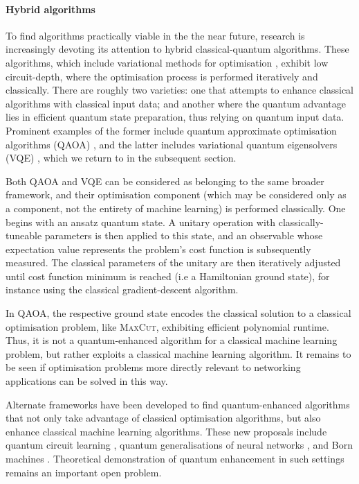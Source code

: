 \paragraph{Hybrid algorithms}

To find algorithms practically viable in the the near future, research is increasingly devoting its attention to hybrid classical-quantum algorithms. These algorithms, which include variational methods for optimisation \cite{bib:moll2018quantum}, exhibit low circuit-depth, where the optimisation process is performed iteratively and classically. There are roughly two varieties: one that attempts to enhance classical algorithms with classical input data; and another where the quantum advantage lies in efficient quantum state preparation, thus relying on quantum input data. Prominent examples of the former include quantum approximate optimisation algorithms (QAOA) \cite{bib:farhi2014quantum, bib:farhi2016quantum}, and the latter includes variational quantum eigensolvers (VQE) \cite{bib:peruzzo2014peruzzo, bib:kandala2017hardware}, which we return to in the subsequent section.

Both QAOA and VQE can be considered as belonging to the same broader framework, and their optimisation component (which may be considered only as a component, not the entirety of machine learning) is performed classically. One begins with an ansatz quantum state. A unitary operation with classically-tuneable parameters is then applied to this state, and an observable whose expectation value represents the problem's cost function is subsequently measured. The classical parameters of the unitary are then iteratively adjusted until cost function minimum is reached (i.e a Hamiltonian ground state), for instance using the classical gradient-descent algorithm.

In QAOA, the respective ground state encodes the classical solution to a classical optimisation problem, like \textsc{MaxCut}, exhibiting efficient polynomial runtime. Thus, it is not a quantum-enhanced algorithm for a classical machine learning problem, but rather exploits a classical machine learning algorithm. It remains to be seen if optimisation problems more directly relevant to networking applications can be solved in this way.

Alternate frameworks have been developed to find quantum-enhanced algorithms that not only take advantage of classical optimisation algorithms, but also enhance classical machine learning algorithms. These new proposals include quantum circuit learning \cite{bib:mitarai2018quantum}, quantum generalisations of neural networks \cite{wan2017quantum}, and Born machines \cite{bib:cheng2018information, bib:benedetti2018generative}. Theoretical demonstration of quantum enhancement in such settings remains an important open problem.

